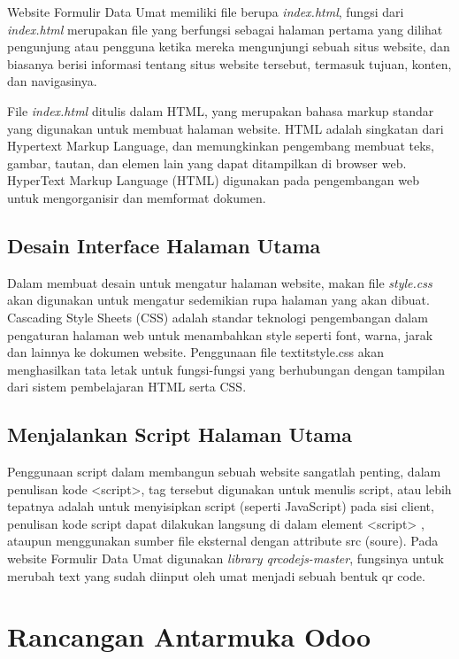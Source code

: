 Website Formulir Data Umat memiliki file berupa \textit{index.html}, fungsi dari \textit{index.html} merupakan file yang berfungsi sebagai halaman pertama yang dilihat pengunjung atau pengguna ketika mereka mengunjungi sebuah situs website, dan biasanya berisi informasi tentang situs website tersebut, termasuk tujuan, konten, dan navigasinya. 

File \textit{index.html} ditulis dalam HTML, yang merupakan bahasa markup standar yang digunakan untuk membuat halaman website. HTML adalah singkatan dari Hypertext Markup Language, dan memungkinkan pengembang membuat teks, gambar, tautan, dan elemen lain yang dapat ditampilkan di browser web. HyperText Markup Language (HTML) digunakan pada pengembangan web untuk mengorganisir dan memformat dokumen. \cite{indexcssScript}


\subsection{Desain Interface Halaman Utama}
\label{sec:style}

Dalam membuat desain untuk mengatur halaman website, makan file \textit{style.css} akan digunakan untuk mengatur sedemikian rupa halaman yang akan dibuat. Cascading Style Sheets (CSS) adalah standar teknologi pengembangan dalam pengaturan halaman web untuk menambahkan
style seperti font, warna, jarak dan lainnya ke dokumen website. Penggunaan file textit{style.css} akan menghasilkan tata letak untuk fungsi-fungsi yang berhubungan dengan tampilan dari sistem pembelajaran HTML serta CSS. \cite{indexcssScript}

\subsection{Menjalankan Script Halaman Utama}
\label{sec:script}

Penggunaan script dalam membangun sebuah website sangatlah penting, dalam penulisan kode <script>, tag tersebut digunakan untuk menulis script, atau lebih tepatnya adalah untuk menyisipkan script (seperti JavaScript) pada sisi client, penulisan kode script dapat dilakukan langsung di dalam element <script> , ataupun menggunakan sumber file eksternal dengan attribute src (soure). Pada website Formulir Data Umat digunakan \textit{library qrcodejs-master}, fungsinya untuk merubah text yang sudah diinput oleh umat menjadi sebuah bentuk qr code.

\newpage

\section{Rancangan Antarmuka Odoo}
\label{sec:rancanganAntarmukaOdoo}

